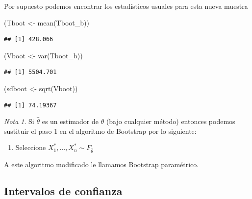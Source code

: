 \documentclass[
  12pt,
]{book}
\newenvironment{Shaded}{\begin{snugshade}}{\end{snugshade}}
\newcommand{\FunctionTok}[1]{\textcolor[rgb]{0.00,0.00,0.00}{#1}}
\newcommand{\NormalTok}[1]{#1}
\newcommand{\OtherTok}[1]{\textcolor[rgb]{0.56,0.35,0.01}{#1}}
\providecommand{\tightlist}{%
  \setlength{\itemsep}{0pt}\setlength{\parskip}{0pt}}
\theoremstyle{definition}
\theoremstyle{definition}
\theoremstyle{definition}
\theoremstyle{definition}
\theoremstyle{remark}
\newtheorem*{remark}{Nota}
\begin{document}
Por supuesto podemos encontrar los estadísticos usuales para esta nueva muestra

\begin{Shaded}
\begin{Highlighting}[]
\NormalTok{(Tboot }\OtherTok{\textless{}{-}} \FunctionTok{mean}\NormalTok{(Tboot\_b))}
\end{Highlighting}
\end{Shaded}

\begin{verbatim}
## [1] 428.066
\end{verbatim}

\begin{Shaded}
\begin{Highlighting}[]
\NormalTok{(Vboot }\OtherTok{\textless{}{-}} \FunctionTok{var}\NormalTok{(Tboot\_b))}
\end{Highlighting}
\end{Shaded}

\begin{verbatim}
## [1] 5504.701
\end{verbatim}

\begin{Shaded}
\begin{Highlighting}[]
\NormalTok{(sdboot }\OtherTok{\textless{}{-}} \FunctionTok{sqrt}\NormalTok{(Vboot))}
\end{Highlighting}
\end{Shaded}

\begin{verbatim}
## [1] 74.19367
\end{verbatim}

\begin{remark}
Si \(\hat \theta\) es un estimador de \(\theta\) (bajo cualquier método) entonces podemos sustituir el paso 1 en el algoritmo de Bootstrap por lo siguiente:

\begin{enumerate}
\def\labelenumi{\arabic{enumi}.}
\tightlist
\item
  Seleccione \(X_{1}^{*}, \ldots, X_{n}^{*} \sim F_{\hat \theta}\)
\end{enumerate}

A este algoritmo modificado le llamamos Bootstrap paramétrico.
\end{remark}

\hypertarget{intervalos-de-confianza}{%
\subsection{Intervalos de confianza}\label{intervalos-de-confianza}}
\end{document}
